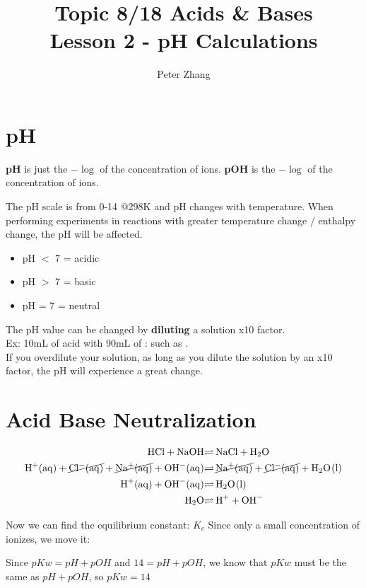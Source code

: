\documentclass{article}
\title{Topic 8/18 Acids \& Bases\\Lesson 2 - pH Calculations}
\author{Peter Zhang}
\begin{document}
\maketitle
\tableofcontents
\newpage

\section{pH}
\textbf{pH} is just the $-\log $ of the concentration of  ions. \textbf{pOH} is the $-\log $ of the concentration of  ions.

The pH scale is from 0-14 @298K and pH changes with temperature. When performing experiments in reactions with greater temperature change / enthalpy change, the pH will be affected.
\begin{itemize}
\item pH $<$ 7 = acidic
\item pH $>$ 7 = basic
\item pH = 7 = neutral
\end{itemize}
The pH value can be changed by \textbf{diluting} a solution x10 factor. \\Ex: 10mL of acid with 90mL of : such as .\\If you overdilute your solution, as long as you dilute the solution by an x10 factor, the pH will experience a great change. 

\section{Acid Base Neutralization}
\begin{align*}
\ce{HCl + NaOH &$\rightleftharpoons$ NaCl + H2O}\\
\ce{H+(aq) + \cancel{\ce{Cl-(aq)}} + \cancel{\ce{Na+(aq)}} + OH-(aq) &$\rightleftharpoons$ \cancel{\ce{Na+(aq)}} + \cancel{\ce{Cl-(aq)}} + H2O(l)}\\
\ce{H+(aq) + OH-(aq) &$\rightleftharpoons$ H2O(l)}\\
\ce{H2O &$\rightleftharpoons$ H+ + OH^{-}}\\
\end{align*}

Now we can find the equilibrium constant: $K_{c}$
\ce{K_{c} = \frac{\ce{[H+][OH^-}}{\ce{[H2O]}}}
Since only a small concentration of  ionizes, we move it:

Since $pKw = pH + pOH$ and $14 = pH + pOH$, we know that $pKw$ must be the same as $pH + pOH$, so $pKw = 14$
\end{document}
